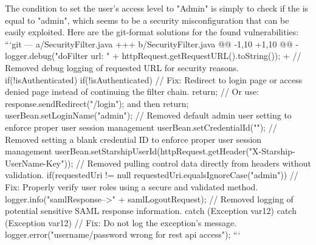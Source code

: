 {}\markdownRendererUlBeginTight
\markdownRendererUlItem The condition to set the user's access level to "Admin" is simply to check if the  is equal to "admin", which seems to be a security misconfiguration that can be easily exploited.\markdownRendererUlItemEnd 
\markdownRendererUlEndTight \markdownRendererInterblockSeparator
{}Here are the git-format solutions for the found vulnerabilities:\markdownRendererInterblockSeparator
{}```git --- a/SecurityFilter.java +++ b/SecurityFilter.java @@ -1,10 +1,10 @@ - logger.debug("doFilter url: " + httpRequest.getRequestURL().toString()); + // Removed debug logging of requested URL for security reasons.\markdownRendererInterblockSeparator
{}\markdownRendererUlBeginTight
\markdownRendererUlItem if(!isAuthenticated) \markdownRendererLeftBrace{}\markdownRendererUlItemEnd 
\markdownRendererUlItem if(!isAuthenticated) \markdownRendererLeftBrace{} // Fix: Redirect to login page or access denied page instead of continuing the filter chain. return; // Or use: response.sendRedirect("/login"); and then return; \markdownRendererRightBrace{}
\markdownRendererUlItemEnd 
\markdownRendererUlItem userBean.setLoginName("admin");\markdownRendererUlItemEnd 
\markdownRendererUlItem // Removed default admin user setting to enforce proper user session management\markdownRendererUlItemEnd 
\markdownRendererUlItem userBean.setCredentialId("");\markdownRendererUlItemEnd 
\markdownRendererUlItem // Removed setting a blank credential ID to enforce proper user session management\markdownRendererUlItemEnd 
\markdownRendererUlItem userBean.setStarshipUserId(httpRequest.getHeader("X-Starship-UserName-Key"));\markdownRendererUlItemEnd 
\markdownRendererUlItem // Removed pulling control data directly from headers without validation.\markdownRendererUlItemEnd 
\markdownRendererUlItem if(requestedUri != null \markdownRendererAmpersand{}\markdownRendererAmpersand{} requestedUri.equalsIgnoreCase("admin")) \markdownRendererLeftBrace{}\markdownRendererUlItemEnd 
\markdownRendererUlItem // Fix: Properly verify user roles using a secure and validated method.\markdownRendererUlItemEnd 
\markdownRendererUlItem logger.info("samlResponse-->" + samlLogoutRequest);\markdownRendererUlItemEnd 
\markdownRendererUlItem // Removed logging of potential sensitive SAML response information.\markdownRendererUlItemEnd 
\markdownRendererUlItem catch (Exception var12) \markdownRendererLeftBrace{}\markdownRendererUlItemEnd 
\markdownRendererUlItem catch (Exception var12) \markdownRendererLeftBrace{} // Fix: Do not log the exception's message. logger.error("username/password wrong for rest api access"); \markdownRendererRightBrace{} ```\markdownRendererUlItemEnd 
